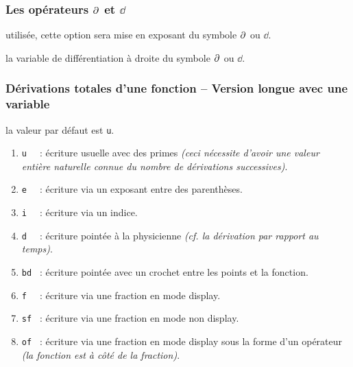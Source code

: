 \documentclass[12pt,a4paper]{book}
\theoremstyle{definition}
\begin{document}
{{\subsubsection{\texorpdfstring{Les opérateurs $\pp{}$ et $\dd{}$}%
                           {Les opérateurs "d rond" et "d droit"}}





\IDoption{} utilisée, cette option sera mise en exposant du symbole $\pp{}$ ou $\dd{}$.

\IDarg{} la variable de différentiation à droite du symbole $\pp{}$ ou $\dd{}$.




\subsubsection{Dérivations totales d'une fonction -- Version longue avec une variable}




\IDoption{} la valeur par défaut est \verb+u+. 
\begin{enumerate}
	\item \verb+u  + : écriture usuelle avec des primes \emph{(ceci nécessite d'avoir une valeur entière naturelle connue du nombre de dérivations successives)}.

	\item \verb+e  + : écriture via un exposant entre des parenthèses.
	
	\item \verb+i  + : écriture via un indice.

	\item \verb+d  + : écriture pointée à la physicienne \emph{(cf. la dérivation par rapport au temps)}.

	\item \verb+bd + : écriture pointée avec un crochet entre les points et la fonction.

	\medskip
	
	\item \verb+f  + : écriture via une fraction en mode display.

	\item \verb+sf + : écriture via une fraction en mode non display.

	\item \verb+of + : écriture via une fraction en mode display sous la forme d'un opérateur \emph{(la fonction est à côté de la fraction)}.


\end{enumerate}}}
\end{document}
